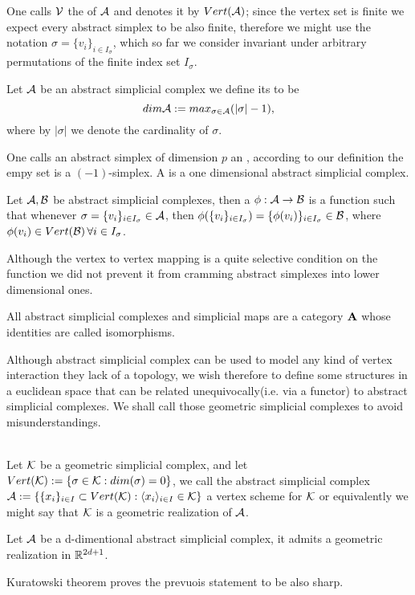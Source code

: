 \documentclass[../1.tex]{subfiles}
\begin{document}
    One calls $\mathcal{V}$ the  of $\mathcal{A}$ and denotes it by $Vert(\mathcal{A})$; since the vertex
    set is finite we expect every abstract simplex to be also finite, therefore we might use the notation $\sigma = \{ v_i \}_{i \in I_\sigma}$,
    which so far we consider invariant under arbitrary permutations of the finite index set $I_\sigma$.

    \begin{defn}
        Let $\mathcal{A}$ be an abstract simplicial complex we define its  to be
        \[ dim \mathcal{A} := max_{\sigma \in \mathcal{A}}(|\sigma|-1), \]
        where by $|\sigma|$ we denote the cardinality of $\sigma$.
    \end{defn}

    One calls an abstract simplex of dimension $p$ an , according to our
    definition the empy set is a $(-1)$-simplex. A  is a one dimensional abstract simplicial complex.

    \begin{defn}
        Let $\mathcal{A},\mathcal{B}$ be abstract simplicial complexes, then a  $\phi : \mathcal{A} \to \mathcal{B}$ is a function 
        such that whenever $\sigma = \{v_i\}_{i \in I_\sigma} \in \mathcal{A}$, then $\phi(\{v_i\}_{i \in I_\sigma}) = \{\phi(v_i)\}_{i \in I_\sigma} \in \mathcal{B}$,
        where $\phi(v_i) \in Vert(\mathcal{B}) \, \forall i \in I_\sigma$.
    \end{defn}

    Although the vertex to vertex mapping is a quite selective condition on the function we did not prevent it from cramming
    abstract simplexes into lower dimensional ones.

    \begin{thm}
        All abstract simplicial complexes and simplicial maps are a category $\textbf{A}$ whose identities are called isomorphisms.
    \end{thm}

    Although abstract simplicial complex can be used to model any kind of vertex interaction they lack of a topology, we wish
    therefore to define some structures in a euclidean space that can be related unequivocally(i.e. via a functor) to abstract simplicial complexes.
    We shall call those geometric simplicial complexes to avoid misunderstandings.

    \begin{defn}
        \\
        Let $\mathcal{K}$ be a geometric simplicial complex, and let $Vert(\mathcal{K}) := \{\sigma \in \mathcal{K} : dim(\sigma) = 0\}$, we call
        the abstract simplicial complex $\mathcal{A} := \{ \{x_i\}_{i \in I} \subset Vert(\mathcal{K}) : \langle x_i \rangle_{i \in I} \in \mathcal{K} \}$
        a vertex scheme for $\mathcal{K}$ or equivalently we might say that $\mathcal{K}$ is a geometric realization of $\mathcal{A}$.
    \end{defn}
    \begin{thm}
        Let $\mathcal{A}$ be a d-dimentional abstract simplicial complex, it admits a geometric realization in $\mathbb{R}^{2d+1}$.
    \end{thm}
    Kuratowski theorem proves the prevuois statement to be also sharp.
\end{document}
